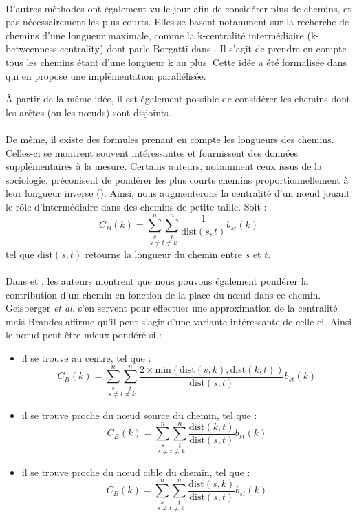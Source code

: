 \documentclass[a4paper, 10pt]{report}
\begin{document}
\paragraph{}D'autres méthodes ont également vu le jour afin de considérer plus de chemins, et pas nécessairement les plus courts. Elles se basent notamment sur la recherche de chemins d'une longueur maximale, comme la k-centralité intermédiaire (k-betweenness centrality) dont parle Borgatti dans \cite{Borgatti2006GraphTheoretic}. Il s'agit de prendre en compte tous les chemins étant d'une longueur k au plus. Cette idée a été formalisée dans \cite{Jiang2009Generalizing} qui en propose une implémentation parallélisée.

À partir de la même idée, il est également possible de considérer les chemins dont les arêtes (ou les n\oe uds) sont disjoints.

% 
% 

\paragraph{}De même, il existe des formules prenant en compte les longueurs des chemins. Celles-ci se montrent souvent intéressantes et fournissent des données supplémentaires à la mesure. Certains auteurs, notamment ceux issus de la sociologie, préconisent de pondérer les plus courts chemins proportionnellement à leur longueur inverse (\cite{Borgatti2006GraphTheoretic}). Ainsi, nous augmenterons la centralité d'un n\oe{}ud jouant le rôle d'intermédiaire dans des chemins de petite taille. 
Soit :
$$
C_{B}(k)=\underset{s\neq t\neq k}{\sum_s^{n}\sum_t^{n}}\frac{1}{\text{dist}(s, t)}b_{st}(k)
$$
tel que $\text{dist}(s, t)$ retourne la longueur du chemin entre $s$ et $t$.

\paragraph{}Dans \cite{Geisberger2008Better} et \cite{Brandes2007OnVariants}, les auteurs montrent que nous pouvons également pondérer la contribution d'un chemin en fonction de la place du n\oe ud dans ce chemin. Geisberger \textit{et al.} s'en servent pour effectuer une approximation de la centralité mais Brandes affirme qu'il peut s'agir d'une variante intéressante de celle-ci. Ainsi le n\oe{}ud peut être mieux pondéré si :
\begin{itemize}
    \item il se trouve au centre, tel que :
$$
C_{B}(k)=\underset{s\neq t\neq k}{\sum_s^{n}\sum_t^{n}}
	\frac{2 \times \text{min}(\text{dist}(s, k), \text{dist}(k, t))}
	     {\text{dist}(s, t)}
	b_{st}(k)
$$
	\item il se trouve proche du n\oe ud source du chemin, tel que :
$$
C_{B}(k)=\underset{s\neq t\neq k}{\sum_s^{n}\sum_t^{n}}\frac{\text{dist}(k, t)}{\text{dist}(s, t)}b_{st}(k)
$$
	\item il se trouve proche du n\oe ud cible du chemin, tel que :
$$
C_{B}(k)=\underset{s\neq t\neq k}{\sum_s^{n}\sum_t^{n}}\frac{\text{dist}(s, k)}{\text{dist}(s, t)}b_{st}(k)
$$
\end{itemize}
\end{document}
